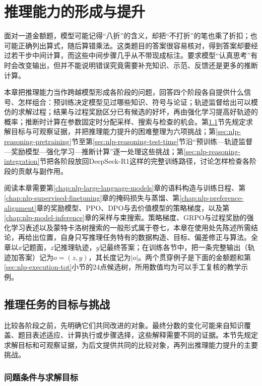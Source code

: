 \chapter{推理能力的形成与提升}
\label{chap:nlp-reasoning}

面对一道金额题，模型可能记得“八折”的含义，却把“不打折”的笔也乘了折扣；也可能正确列出算式，随后算错乘法。这类题目的答案很容易核对，得到答案却要经过若干步中间计算，而这些中间步骤几乎从不带现成标注。要求模型“认真思考”有时会改变输出，但并不能说明错误究竟需要补充知识、示范、反馈还是更多的推断计算。

本章把推理能力当作跨越模型形成各阶段的问题，回答四个阶段各自提供什么信号、怎样组合：预训练决定模型见过哪些知识、符号与论证；轨迹监督给出可以模仿的求解过程；结果与过程奖励区分已有候选的好坏，再由强化学习提高好轨迹的概率；推断时计算在参数固定时分配采样、搜索与检查的机会。第\ref{sec:nlp-reasoning-objectives}节先规定求解目标与可观察证据，并把推理能力提升的困难整理为六项挑战；第\ref{sec:nlp-reasoning-pretraining}节至第\ref{sec:nlp-reasoning-test-time}节沿“预训练—轨迹监督—奖励模型—强化学习—推断计算”逐一处理这些挑战；第\ref{sec:nlp-reasoning-integration}节把各阶段放回DeepSeek-R1这样的完整训练路径，讨论怎样检查各阶段的贡献与副作用。

阅读本章需要第\ref{chap:nlp-large-language-models}章的语料构造与训练日程、第\ref{chap:nlp-supervised-finetuning}章的掩码损失与蒸馏、第\ref{chap:nlp-preference-alignment}章的奖励模型、PPO、DPO与去价值模型的策略梯度，以及第\ref{chap:nlp-model-inference}章的采样与束搜索。策略梯度、GRPO与过程奖励的强化学习表述以及蒙特卡洛树搜索的一般形式属于卷七，本章在使用处先陈述所需结论，再给出位置，自身只写推理任务特有的数据构造、目标、偏差修正与算法。全章以$x$记题面，$z$记推理轨迹，$y$记最终答案；在训练各节中，把一条完整输出（轨迹加答案）记为$o=(z,y)$，其长度记为$|o|$。两个贯穿例子是下面的金额题和第\ref{sec:nlp-execution-tot}小节的24点候选树，所用数值均为可以手工复核的教学示例。

\section{推理任务的目标与挑战}
\label{sec:nlp-reasoning-objectives}

比较各阶段之前，先明确它们共同改进的对象。最终分数的变化可能来自知识覆盖、题目表述适应、计算执行或步骤选择，这些解释需要不同的证据。本节先规定求解目标和可观察证据，为后文提供共同的比较对象，再列出推理能力提升的主要挑战。

\subsection{问题条件与求解目标}
\label{sec:nlp-reasoning-problems}

